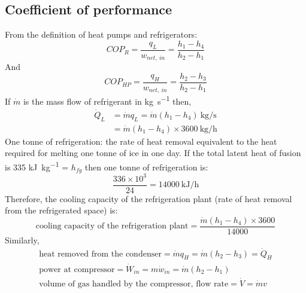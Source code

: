 \subsection{Coefficient of performance}
From the definition of heat pumps and refrigerators:
\begin{equation}
  COP_R = \frac{q_L}{w_{net, \ in}} = \frac{h_1 - h_4}{h_2 - h_1}
\end{equation}
And
\begin{equation}
  COP_{HP} = \frac{q_H}{w_{net, \ in}} = \frac{h_2 - h_3}{h_2 - h_1}
\end{equation}
If $\dot{m}$ is the mass flow of refrigerant in \si{\kg\per\second} then,
\begin{align}
  \dot{Q}_L & = \dot{m}q_L = \dot{m} (h_1 - h_4) \ \si{\kg\per\second} \\
            & = \dot{m} (h_1 - h_4) \times 3600 \ \si{\kg\per\hour}
\end{align}
One tonne of refrigeration: the rate of heat removal equivalent to the heat required for melting one tonne of ice in one day. If the total latent heat of fusion is 335 \si{\kilo\joule\per\kg} = $h_{fg}$ then one tonne of refrigeration is:
\begin{equation}
  \frac{336 \times 10^{3}}{24} = 14000 \ \si{\kilo\joule\per\hour}
\end{equation}
Therefore, the cooling capacity of the refrigeration plant (rate of heat removal from the refrigerated space) is:
\begin{equation}
  \textrm{cooling capacity of the refrigeration plant} = \frac{\dot{m}(h_1 - h_4) \times 3600}{14000}
\end{equation}
Similarly,
\begin{gather}
  \textrm{heat removed from the condenser} = \dot{m} q_H = \dot{m} (h_2 - h_3) = \dot{Q}_H\\
  \textrm{power at compressor} = \dot{W}_{in} = m\dot{w}_{in} = \dot{m} (h_2 - h_1)\\
  \textrm{volume of gas handled by the compressor, flow rate} = \dot{V} = \dot{m}v
\end{gather}
